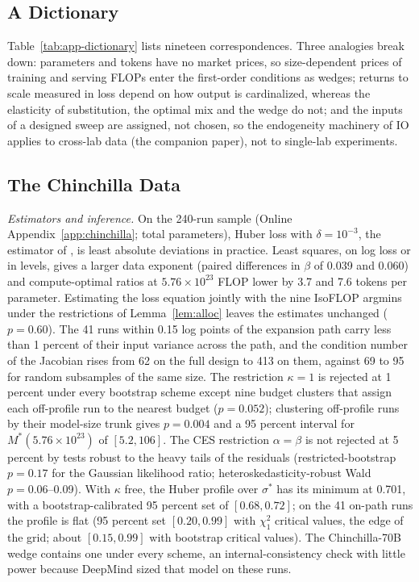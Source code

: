 \subsection{A Dictionary}\label{app:add-dictionary}

Table~\ref{tab:app-dictionary} lists nineteen correspondences. Three analogies break down: parameters and tokens have no
market prices, so size-dependent prices of training and serving FLOPs enter the first-order conditions as wedges; returns
to scale measured in loss depend on how output is cardinalized, whereas the elasticity of substitution, the optimal mix
and the wedge do not; and the inputs of a designed sweep are assigned, not chosen, so the endogeneity machinery of IO
applies to cross-lab data (the companion paper), not to single-lab experiments.



\subsection{The Chinchilla Data}\label{app:add-chinchilla}

\textit{Estimators and inference.} On the 240-run sample (Online Appendix~\ref{app:chinchilla}; total parameters), Huber loss with
$\delta=10^{-3}$, the estimator of \citet{besiroglu2024chinchilla}, is least absolute deviations in practice. Least squares,
on log loss or in levels, gives a larger data exponent (paired differences in $\beta$ of 0.039 and 0.060) and
compute-optimal ratios at $5.76\times10^{23}$ FLOP lower by 3.7 and 7.6 tokens per parameter. Estimating the loss equation
jointly with the nine IsoFLOP argmins under the restrictions of Lemma~\ref{lem:alloc} leaves the estimates unchanged
($p=0.60$). The 41 runs within 0.15 log points of the expansion path carry less than 1 percent of their input variance
across the path, and the condition number of the Jacobian rises from 62 on the full design to 413 on them, against 69 to 95
for random subsamples of the same size. The restriction $\kappa=1$ is rejected at 1 percent under every bootstrap scheme
except nine budget clusters that assign each off-profile run to the nearest budget ($p=0.052$); clustering off-profile runs
by their model-size trunk gives $p=0.004$ and a 95 percent interval for $M^*(5.76\times10^{23})$ of $[5.2,106]$. The CES
restriction $\alpha=\beta$ is not rejected at 5 percent by tests robust to the heavy tails of the residuals
(restricted-bootstrap $p=0.17$ for the Gaussian likelihood ratio; heteroskedasticity-robust Wald $p=0.06$--0.09). With
$\kappa$ free, the Huber profile over $\sigma^*$ has its minimum at 0.701, with a bootstrap-calibrated 95 percent set of
$[0.68,0.72]$; on the 41 on-path runs the profile is flat (95 percent set $[0.20,0.99]$ with $\chi^2_1$ critical values,
the edge of the grid; about $[0.15,0.99]$ with bootstrap critical values). The
Chinchilla-70B wedge contains one under every scheme, an internal-consistency check with little power because DeepMind
sized that model on these runs.


